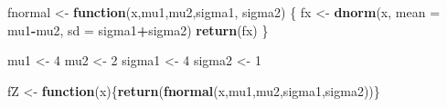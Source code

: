 \documentclass[
]{article}
\newenvironment{Shaded}{\begin{snugshade}}{\end{snugshade}}
\newcommand{\AttributeTok}[1]{\textcolor[rgb]{0.13,0.29,0.53}{#1}}
\newcommand{\ControlFlowTok}[1]{\textcolor[rgb]{0.13,0.29,0.53}{\textbf{#1}}}
\newcommand{\DecValTok}[1]{\textcolor[rgb]{0.00,0.00,0.81}{#1}}
\newcommand{\FunctionTok}[1]{\textcolor[rgb]{0.13,0.29,0.53}{\textbf{#1}}}
\newcommand{\NormalTok}[1]{#1}
\newcommand{\OtherTok}[1]{\textcolor[rgb]{0.56,0.35,0.01}{#1}}
\newcommand{\SpecialCharTok}[1]{\textcolor[rgb]{0.81,0.36,0.00}{\textbf{#1}}}
\begin{document}
\begin{Shaded}
\begin{Highlighting}[]
\NormalTok{fnormal }\OtherTok{\textless{}{-}} \ControlFlowTok{function}\NormalTok{(x,mu1,mu2,sigma1, sigma2) \{ }
\NormalTok{  fx }\OtherTok{\textless{}{-}} \FunctionTok{dnorm}\NormalTok{(x, }\AttributeTok{mean =}\NormalTok{ mu1}\SpecialCharTok{{-}}\NormalTok{mu2, }\AttributeTok{sd =}\NormalTok{ sigma1}\SpecialCharTok{+}\NormalTok{sigma2)}
  \FunctionTok{return}\NormalTok{(fx) }
\NormalTok{\}}

\NormalTok{mu1 }\OtherTok{\textless{}{-}} \DecValTok{4}
\NormalTok{mu2 }\OtherTok{\textless{}{-}} \DecValTok{2}
\NormalTok{sigma1 }\OtherTok{\textless{}{-}} \DecValTok{4}
\NormalTok{sigma2 }\OtherTok{\textless{}{-}} \DecValTok{1}

\NormalTok{fZ }\OtherTok{\textless{}{-}} \ControlFlowTok{function}\NormalTok{(x)\{}\FunctionTok{return}\NormalTok{(}\FunctionTok{fnormal}\NormalTok{(x,mu1,mu2,sigma1,sigma2))\} }
\end{Highlighting}
\end{Shaded}
\end{document}
